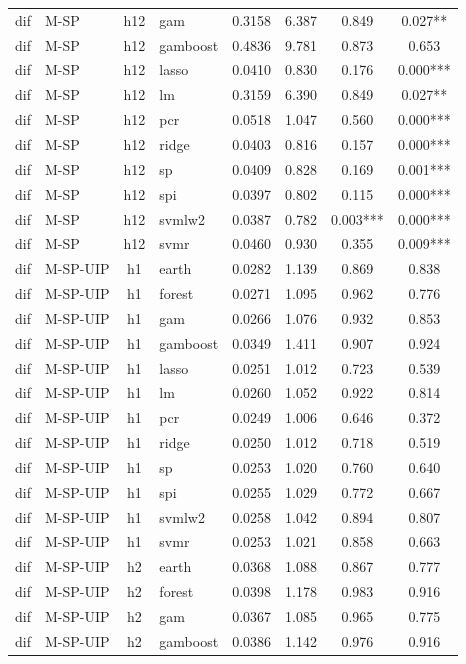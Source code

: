 \begin{ThreePartTable}
\begin{longtable}[t]{llclcccc}
dif & M-SP & h12 & gam & 0.3158 & 6.387 & 0.849 & 0.027**\\
dif & M-SP & h12 & gamboost & 0.4836 & 9.781 & 0.873 & 0.653\\
dif & M-SP & h12 & lasso & 0.0410 & 0.830 & 0.176 & 0.000***\\
dif & M-SP & h12 & lm & 0.3159 & 6.390 & 0.849 & 0.027**\\
dif & M-SP & h12 & pcr & 0.0518 & 1.047 & 0.560 & 0.000***\\
dif & M-SP & h12 & ridge & 0.0403 & 0.816 & 0.157 & 0.000***\\
dif & M-SP & h12 & sp & 0.0409 & 0.828 & 0.169 & 0.001***\\
dif & M-SP & h12 & spi & 0.0397 & 0.802 & 0.115 & 0.000***\\
dif & M-SP & h12 & svmlw2 & 0.0387 & 0.782 & 0.003*** & 0.000***\\
dif & M-SP & h12 & svmr & 0.0460 & 0.930 & 0.355 & 0.009***\\
\addlinespace
dif & M-SP-UIP & h1 & earth & 0.0282 & 1.139 & 0.869 & 0.838\\
dif & M-SP-UIP & h1 & forest & 0.0271 & 1.095 & 0.962 & 0.776\\
dif & M-SP-UIP & h1 & gam & 0.0266 & 1.076 & 0.932 & 0.853\\
dif & M-SP-UIP & h1 & gamboost & 0.0349 & 1.411 & 0.907 & 0.924\\
dif & M-SP-UIP & h1 & lasso & 0.0251 & 1.012 & 0.723 & 0.539\\
dif & M-SP-UIP & h1 & lm & 0.0260 & 1.052 & 0.922 & 0.814\\
dif & M-SP-UIP & h1 & pcr & 0.0249 & 1.006 & 0.646 & 0.372\\
dif & M-SP-UIP & h1 & ridge & 0.0250 & 1.012 & 0.718 & 0.519\\
dif & M-SP-UIP & h1 & sp & 0.0253 & 1.020 & 0.760 & 0.640\\
dif & M-SP-UIP & h1 & spi & 0.0255 & 1.029 & 0.772 & 0.667\\
dif & M-SP-UIP & h1 & svmlw2 & 0.0258 & 1.042 & 0.894 & 0.807\\
dif & M-SP-UIP & h1 & svmr & 0.0253 & 1.021 & 0.858 & 0.663\\
\addlinespace
dif & M-SP-UIP & h2 & earth & 0.0368 & 1.088 & 0.867 & 0.777\\
dif & M-SP-UIP & h2 & forest & 0.0398 & 1.178 & 0.983 & 0.916\\
dif & M-SP-UIP & h2 & gam & 0.0367 & 1.085 & 0.965 & 0.775\\
dif & M-SP-UIP & h2 & gamboost & 0.0386 & 1.142 & 0.976 & 0.916\\

\end{longtable}
\end{ThreePartTable}

